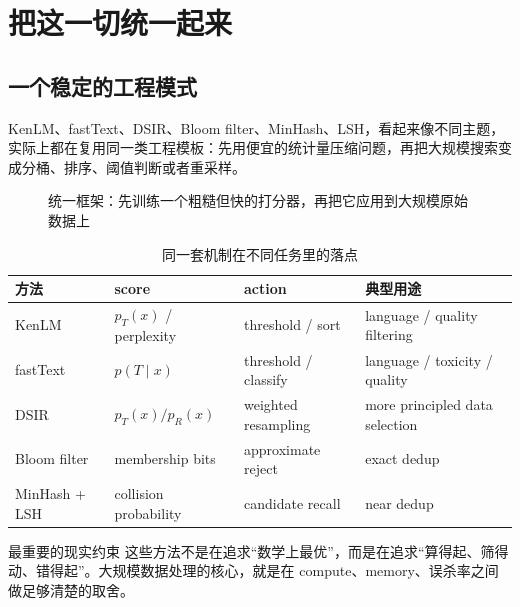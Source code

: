 \section{把这一切统一起来}

\subsection{一个稳定的工程模式}

KenLM、fastText、DSIR、Bloom filter、MinHash、LSH，看起来像不同主题，实际上都在复用同一类工程模板：先用便宜的统计量压缩问题，再把大规模搜索变成分桶、排序、阈值判断或者重采样。

\begin{figure}[H]
\centering
{}
\caption{统一框架：先训练一个粗糙但快的打分器，再把它应用到大规模原始数据上}
\end{figure}

\begin{table}[H]
\centering
\small
\renewcommand{\arraystretch}{1.15}
\begin{tabular}{p{2.2cm}p{4.1cm}p{4.0cm}p{3.3cm}}
\toprule
\textbf{方法} & \textbf{score} & \textbf{action} & \textbf{典型用途} \\
\midrule
KenLM & $p_T(x)$ / perplexity & threshold / sort & language / quality filtering \\
fastText & $p(T\mid x)$ & threshold / classify & language / toxicity / quality \\
DSIR & $p_T(x)/p_R(x)$ & weighted resampling & more principled data selection \\
Bloom filter & membership bits & approximate reject & exact dedup \\
MinHash + LSH & collision probability & candidate recall & near dedup \\
\bottomrule
\end{tabular}
\caption{同一套机制在不同任务里的落点}
\end{table}

\begin{warningbox}{最重要的现实约束}
这些方法不是在追求“数学上最优”，而是在追求“算得起、筛得动、错得起”。大规模数据处理的核心，就是在 compute、memory、误杀率之间做足够清楚的取舍。
\end{warningbox}

